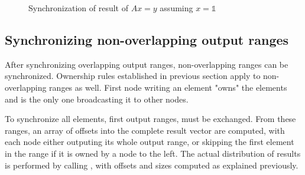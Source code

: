 \documentclass[thesis=M,english]{FITthesis}[2019/12/23]
\begin{document}
\begin{figure}[htp]
    \caption{Synchronization of result of \(Ax = y\) assuming \(x=\mathbb{1}\)}
\end{figure}


\subsection{Synchronizing non-overlapping output ranges}

After synchronizing overlapping output ranges, non-overlapping ranges can be synchronized.
Ownership rules established in previous section apply to non-overlapping ranges as well.
First node writing an element "owns" the elements and is the only one broadcasting it to
other nodes.

To synchronize all elements, first output ranges, must be exchanged. From these ranges,
an array of offsets into the complete result vector are computed, with each node
either outputing its whole output range, or skipping the first element in the range if
it is owned by a node to the left. The actual distribution of results is performed by calling , with
offsets and sizes computed as explained previously.
\end{document}
